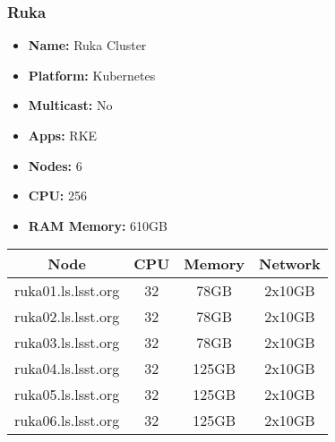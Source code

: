 \newpage
\subsubsection{Ruka}
\begin{itemize}
  \itemsep0em 
  \item \textbf{Name:}       Ruka Cluster
  \item \textbf{Platform:}   Kubernetes
  \item \textbf{Multicast:}  No
  \item \textbf{Apps:}       RKE
  \item \textbf{Nodes:}      6
  \item \textbf{CPU:}        256
  \item \textbf{RAM Memory:} 610GB
\end{itemize}
\begin{center}
  \small
  \begin{tabular}{||c c c c||}
    \hline
    \textbf{Node} & \textbf{CPU} & \textbf{Memory} & \textbf{Network} \\ [0.5ex]
    \hline
    ruka01.ls.lsst.org & 32 & 78GB & 2x10GB \\
    \hline
    ruka02.ls.lsst.org & 32 & 78GB & 2x10GB \\
    \hline
    ruka03.ls.lsst.org & 32 & 78GB & 2x10GB \\
    \hline
    ruka04.ls.lsst.org & 32 & 125GB & 2x10GB \\
    \hline
    ruka05.ls.lsst.org & 32 & 125GB & 2x10GB \\
    \hline
    ruka06.ls.lsst.org & 32 & 125GB & 2x10GB \\
    \hline
  \end{tabular}
\end{center}

